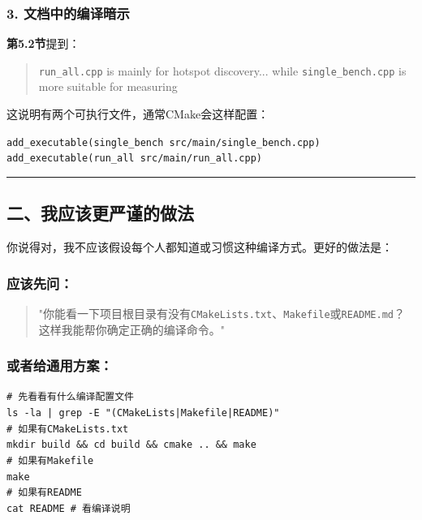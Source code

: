 \documentclass[11pt, a4paper]{article}
\begin{document}
\begin{aibox}
\subsubsection*{3. 文档中的编译暗示}

\textbf{第5.2节}提到：
\begin{quote}
\texttt{run\_all.cpp} is mainly for hotspot discovery... while \texttt{single\_bench.cpp} is more suitable for measuring
\end{quote}
这说明有两个可执行文件，通常CMake会这样配置：
\begin{tcolorbox}[colback=white,colframe=gray!50!white,boxrule=0.5pt,arc=2pt,left=5pt,right=5pt,top=5pt,bottom=5pt]
\texttt{add\_executable(single\_bench src/main/single\_bench.cpp)}\\
\texttt{add\_executable(run\_all src/main/run\_all.cpp)}
\end{tcolorbox}

\begin{center}\rule{\textwidth}{0.4pt}\end{center}

\subsection*{二、我应该更严谨的做法}

你说得对，我不应该假设每个人都知道或习惯这种编译方式。更好的做法是：

\subsubsection*{应该先问：}
\begin{quote}
"你能看一下项目根目录有没有\texttt{CMakeLists.txt}、\texttt{Makefile}或\texttt{README.md}？这样我能帮你确定正确的编译命令。"
\end{quote}

\subsubsection*{或者给通用方案：}
\begin{tcolorbox}[colback=white,colframe=gray!50!white,boxrule=0.5pt,arc=2pt,left=5pt,right=5pt,top=5pt,bottom=5pt]
\texttt{\# 先看看有什么编译配置文件}\\
\texttt{ls -la | grep -E "(CMakeLists|Makefile|README)"}\\[0.5em]
\texttt{\# 如果有CMakeLists.txt}\\
\texttt{mkdir build \&\& cd build \&\& cmake .. \&\& make}\\[0.5em]
\texttt{\# 如果有Makefile}\\
\texttt{make}\\[0.5em]
\texttt{\# 如果有README}\\
\texttt{cat README  \# 看编译说明}
\end{tcolorbox}


\end{aibox}
\end{document}

